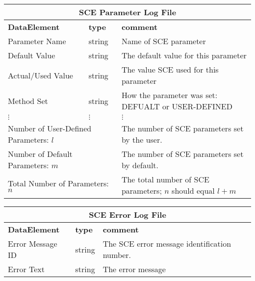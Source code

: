 \vspace{.5in}
\begin{tabular}{llp{4in}}
\multicolumn{3}{c}{{\bf SCE Parameter Log File}}\\ \hline\hline
{\bf DataElement} &  {\bf type}  &   {\bf comment} \\ \hline
Parameter Name & string & Name of SCE parameter \\
Default Value & string & The default value for this parameter \\
Actual/Used Value & string & The value SCE used for this parameter \\
Method Set & string & How the parameter was set: DEFUALT or USER-DEFINED \\
$\vdots $ & $\vdots $ & $\vdots$  \\
\multicolumn{2}{l}{Number of User-Defined Parameters: $l$} & The number of
SCE parameters set by the user. \\
\multicolumn{2}{l}{Number of Default Parameters: $m$} & The number of SCE parameters
set by default. \\
\multicolumn{2}{l}{Total Number of Parameters: $n$} & The total number of SCE
parameters;  $n$ should equal $l+m$
\end{tabular}

\vspace{.5in}
\vspace{.5in}
\begin{tabular}{llp{4in}}
\multicolumn{3}{c}{{\bf SCE Error Log File}}\\ \hline\hline
{\bf DataElement} &  {\bf type}  &   {\bf comment} \\ \hline
Error Message ID & string & The SCE error message identification number. \\
Error Text & string & The error message 
\end{tabular}




